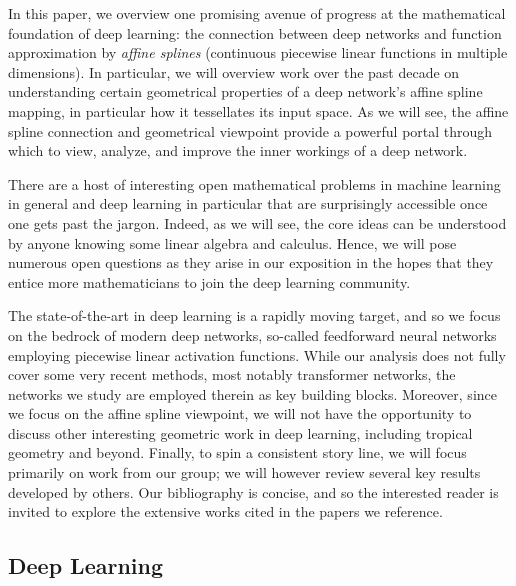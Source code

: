 \documentclass{notices}
\begin{document}
In this paper, we overview one promising avenue of progress at the mathematical foundation of deep learning: the connection between deep networks and function approximation by {\em affine splines} (continuous piecewise linear functions in multiple dimensions).
In particular, we will overview work over the past decade on understanding certain geometrical properties of a deep network's affine spline mapping, in particular how it tessellates its input space.
As we will see, the affine spline connection and geometrical viewpoint provide a powerful portal through which to view, analyze, and improve the inner workings of a deep network.


There are a host of interesting open mathematical problems in machine learning in general and deep learning in particular that are surprisingly accessible once one gets past the jargon.
Indeed, as we will see, the core ideas can be understood by anyone knowing some linear algebra and calculus.
Hence, we will pose numerous open questions as they arise in our exposition in the hopes that they entice more mathematicians to join the deep learning community.


The state-of-the-art in deep learning is a rapidly moving target, and so we focus on the bedrock of modern deep networks, so-called feedforward neural networks employing piecewise linear activation functions.
While our analysis does not fully cover some very recent methods, most notably transformer networks, the networks we study are employed therein as key building blocks.
Moreover, since we focus on the affine spline viewpoint, we will not have the opportunity to discuss other interesting geometric work in deep learning, including tropical geometry \cite{zhang2018tropical} and beyond.
Finally, to spin a consistent story line, we will focus primarily on work from our group; we will however review several key results developed by others.
Our bibliography is concise, and so the interested reader is invited to explore the extensive works cited in the papers we reference.


\subsection*{Deep Learning}
\end{document}
